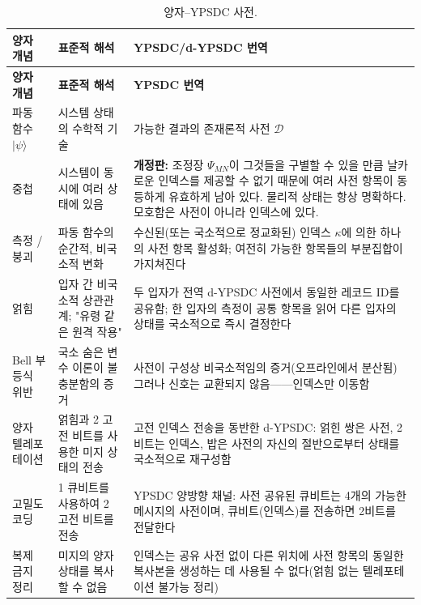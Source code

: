 \documentclass[12pt,a4paper]{article}
\begin{document}
	\begin{longtable}{p{3.5cm} p{5cm} p{7cm}}
		\caption{양자–YPSDC 사전.}\label{tab:quantum-dict}\\
		\toprule
		\textbf{양자 개념} & \textbf{표준적 해석} & \textbf{YPSDC/d-YPSDC 번역} \\
		\midrule
		\endfirsthead
		\toprule
		\textbf{양자 개념} & \textbf{표준적 해석} & \textbf{YPSDC 번역} \\
		\midrule
		\endhead
		\hline
		\endfoot
		\bottomrule
		\endlastfoot
		
		파동 함수 \(|\psi\rangle\) & 
		시스템 상태의 수학적 기술 & 
		가능한 결과의 존재론적 사전 \(\mathcal{D}\) \\
		
		중첩 & 
		시스템이 동시에 여러 상태에 있음 & 
		\textbf{개정판:} 조정장 \(\Psi_{MN}\)이 그것들을 구별할 수 있을 만큼 날카로운 인덱스를 제공할 수 없기 때문에 여러 사전 항목이 동등하게 유효하게 남아 있다. 물리적 상태는 항상 명확하다. 모호함은 사전이 아니라 인덱스에 있다. \\
		
		측정 / 붕괴 & 
		파동 함수의 순간적, 비국소적 변화 & 
		수신된(또는 국소적으로 정교화된) 인덱스 \(\kappa\)에 의한 하나의 사전 항목 활성화; 여전히 가능한 항목들의 부분집합이 가지쳐진다 \\
		
		얽힘 & 
		입자 간 비국소적 상관관계; "유령 같은 원격 작용" & 
		두 입자가 전역 d-YPSDC 사전에서 동일한 레코드 ID를 공유함; 한 입자의 측정이 공통 항목을 읽어 다른 입자의 상태를 국소적으로 즉시 결정한다 \\
		
		Bell 부등식 위반 & 
		국소 숨은 변수 이론이 불충분함의 증거 & 
		사전이 구성상 비국소적임의 증거(오프라인에서 분산됨) 그러나 신호는 교환되지 않음——인덱스만 이동함 \\
		
		양자 텔레포테이션 & 
		얽힘과 2 고전 비트를 사용한 미지 상태의 전송 & 
		고전 인덱스 전송을 동반한 d-YPSDC: 얽힌 쌍은 사전, 2비트는 인덱스, 밥은 사전의 자신의 절반으로부터 상태를 국소적으로 재구성함 \\
		
		고밀도 코딩 & 
		1 큐비트를 사용하여 2 고전 비트를 전송 & 
		YPSDC 양방향 채널: 사전 공유된 큐비트는 4개의 가능한 메시지의 사전이며, 큐비트(인덱스)를 전송하면 2비트를 전달한다 \\
		
		복제 금지 정리 & 
		미지의 양자 상태를 복사할 수 없음 & 
		인덱스는 공유 사전 없이 다른 위치에 사전 항목의 동일한 복사본을 생성하는 데 사용될 수 없다(얽힘 없는 텔레포테이션 불가능 정리) \\
		

\end{longtable}
\end{document}
